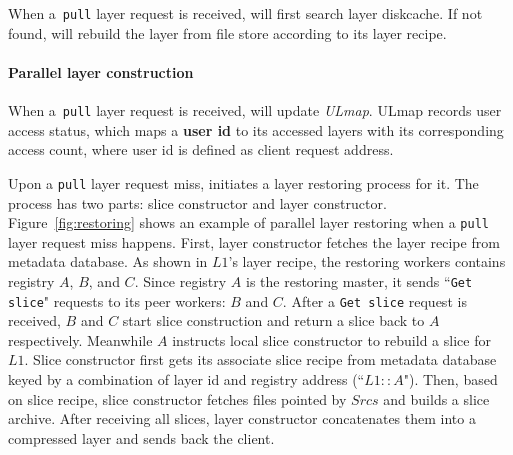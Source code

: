 


When a~\texttt{pull} layer request is received, 
\sysname will first search layer diskcache.
If not found,
\sysname will rebuild the layer from file store according to its layer recipe. 

\paragraph{Parallel layer construction}

When a~\texttt{pull} layer request is received, 
\sysname will update \emph{ULmap}. 
ULmap records user access status,
which maps a \textbf{user id} to its accessed layers with its corresponding access count,
where user id is defined as client request address.

Upon a \texttt{pull} layer request miss, 
\sysname initiates a layer restoring process for it.
The process has two parts: slice constructor and layer constructor.
Figure~\ref{fig:restoring} shows an example of parallel layer restoring when a \texttt{pull} layer request miss happens.
First, 
layer constructor fetches the layer recipe from metadata database.
As shown in $L1$'s layer recipe, 
the restoring workers contains registry $A$, $B$, and $C$.
Since registry $A$ is the restoring master,
it sends ``\texttt{Get slice}" requests to its peer workers: $B$ and $C$.
After a \texttt{Get slice} request is received, 
$B$ and $C$ start slice construction and return a slice back to $A$ respectively.
Meanwhile $A$ instructs local slice constructor to rebuild a slice for $L1$.
Slice constructor first gets its associate slice recipe from metadata database 
keyed by a combination of  layer id and registry address (``$L1::A$").
Then, based on slice recipe,
slice constructor fetches files pointed by $Srcs$
and builds a slice archive.
After receiving all slices, layer constructor concatenates them into a compressed layer
and sends back the client. 


